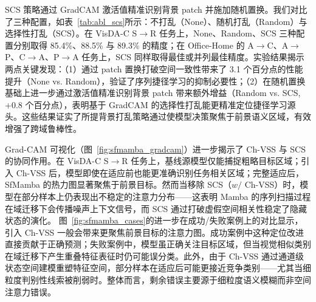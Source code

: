 SCS 策略通过 GradCAM 激活值精准识别背景 patch 并施加随机置换。我们对比了三种配置，如表~\ref{tab:abl_scs}所示：不打乱（None）、随机打乱（Random）与选择性打乱（SCS）。在 VisDA-C S$\rightarrow$R 任务上，None、Random、SCS 三种配置分别取得 85.4\%、88.5\% 与 89.3\% 的精度；在 Office-Home 的 A$\rightarrow$C、A$\rightarrow$P、C$\rightarrow$A、P$\rightarrow$A 任务上，SCS 同样取得最佳或并列最佳精度。实验结果揭示两点关键发现：（1）通过 patch 置换打破空间一致性带来了 3.1 个百分点的性能提升（None vs. Random），验证了序列捷径学习的抑制必要性；（2）在随机置换基础上进一步通过激活值精准识别背景 patch 带来额外增益（Random vs. SCS, +0.8 个百分点），表明基于 GradCAM 的选择性打乱能更精准定位捷径学习源头。这些结果证实了所提背景打乱策略通过使模型决策聚焦于前景语义区域，有效增强了跨域鲁棒性。

\begin{table}[!htbp]
    \vspace{0.5em}\centering\wuhao
    \small
    \setlength{\tabcolsep}{1pt}
\end{table}

Grad-CAM 可视化（图~\ref{fig:sfmamba_gradcam}）进一步揭示了 Ch-VSS 与 SCS 的协同作用。在 VisDA-C S$\rightarrow$R 任务上，基线源模型仅能捕捉粗略目标区域；引入 Ch-VSS 后，模型即使在适应前也能更准确识别任务相关区域；完整适应后，SfMamba 的热力图显著聚焦于前景目标。然而当移除 SCS（$w/$ Ch-VSS）时，模型在部分样本上仍表现出不稳定的注意力分布——这表明 Mamba 的序列扫描过程在域迁移下会传播噪声上下文信号，而 SCS 通过打破虚假空间相关性稳定了隐藏状态的演化。
图~\ref{fig:sfmamba_cases}的进一步在成功/失败案例上的对比显示，引入 Ch-VSS 一般会带来更聚焦前景目标的注意力图。成功案例中这种定位改进直接贡献于正确预测；失败案例中，模型虽正确关注目标区域，但当视觉相似类别在域迁移下产生重叠特征表征时仍可能误分类。此外，由于 Ch-VSS 通过通道级状态空间建模重塑特征空间，部分样本在适应后可能更接近竞争类别——尤其当细粒度判别性线索被削弱时。整体而言，剩余错误主要源于细粒度语义模糊而非空间注意力错误。

